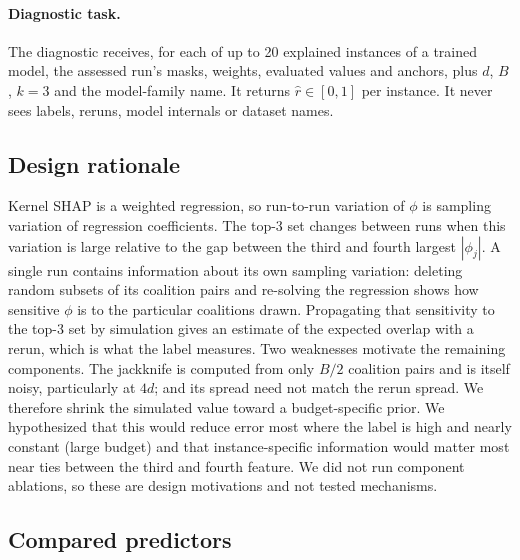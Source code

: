 \documentclass{article}
\newcommand{\rhat}{\hat r}
\begin{document}
\paragraph{Diagnostic task.}
The diagnostic receives, for each of up to 20 explained instances of a trained model, the assessed run's masks, weights, evaluated values and anchors, plus $d$, $B$, $k=3$ and the model-family name. It returns $\rhat\in[0,1]$ per instance. It never sees labels, reruns, model internals or dataset names.

\subsection{Design rationale}
Kernel SHAP is a weighted regression, so run-to-run variation of $\phi$ is sampling variation of regression coefficients. The top-3 set changes between runs when this variation is large relative to the gap between the third and fourth largest $|\phi_j|$. A single run contains information about its own sampling variation: deleting random subsets of its coalition pairs and re-solving the regression shows how sensitive $\phi$ is to the particular coalitions drawn. Propagating that sensitivity to the top-3 set by simulation gives an estimate of the expected overlap with a rerun, which is what the label measures. Two weaknesses motivate the remaining components. The jackknife is computed from only $B/2$ coalition pairs and is itself noisy, particularly at $4d$; and its spread need not match the rerun spread. We therefore shrink the simulated value toward a budget-specific prior. We hypothesized that this would reduce error most where the label is high and nearly constant (large budget) and that instance-specific information would matter most near ties between the third and fourth feature. We did not run component ablations, so these are design motivations and not tested mechanisms.

\subsection{Compared predictors}
\end{document}
